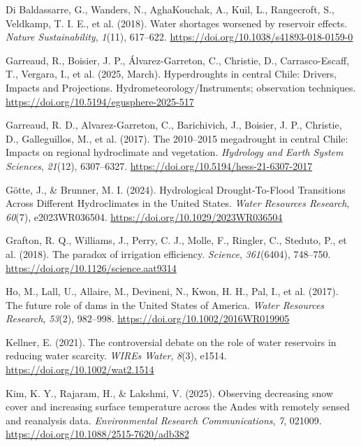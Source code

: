 \documentclass[
]{agujournal2019}
\newlength{\cslhangindent}
\newenvironment{CSLReferences}[2] %
 {\begin{list}{}{%
  \setlength{\itemindent}{0pt}
  \setlength{\leftmargin}{0pt}
  \setlength{\parsep}{0pt}
  \ifodd #1
   \setlength{\leftmargin}{\cslhangindent}
   \setlength{\itemindent}{-1\cslhangindent}
  \fi
  \setlength{\itemsep}{#2\baselineskip}}}
 {\end{list}}
\begin{document}
\begin{CSLReferences}{1}{0}
Di Baldassarre, G., Wanders, N., AghaKouchak, A., Kuil, L., Rangecroft,
S., Veldkamp, T. I. E., et al. (2018). Water shortages worsened by
reservoir effects. \emph{Nature Sustainability}, \emph{1}(11), 617--622.
\url{https://doi.org/10.1038/s41893-018-0159-0}

Garreaud, R., Boisier, J. P., Álvarez-Garreton, C., Christie, D.,
Carrasco-Escaff, T., Vergara, I., et al. (2025, March). Hyperdroughts in
central {Chile}: {Drivers}, {Impacts} and {Projections}.
Hydrometeorology/Instruments; observation techniques.
\url{https://doi.org/10.5194/egusphere-2025-517}

Garreaud, R. D., Alvarez-Garreton, C., Barichivich, J., Boisier, J. P.,
Christie, D., Galleguillos, M., et al. (2017). The 2010--2015
megadrought in central {Chile}: Impacts on regional hydroclimate and
vegetation. \emph{Hydrology and Earth System Sciences}, \emph{21}(12),
6307--6327. \url{https://doi.org/10.5194/hess-21-6307-2017}

Götte, J., \& Brunner, M. I. (2024). Hydrological {Drought}‐{To}‐{Flood}
{Transitions} {Across} {Different} {Hydroclimates} in the {United}
{States}. \emph{Water Resources Research}, \emph{60}(7), e2023WR036504.
\url{https://doi.org/10.1029/2023WR036504}

Grafton, R. Q., Williams, J., Perry, C. J., Molle, F., Ringler, C.,
Steduto, P., et al. (2018). The paradox of irrigation efficiency.
\emph{Science}, \emph{361}(6404), 748--750.
\url{https://doi.org/10.1126/science.aat9314}

Ho, M., Lall, U., Allaire, M., Devineni, N., Kwon, H. H., Pal, I., et
al. (2017). The future role of dams in the {United} {States} of
{America}. \emph{Water Resources Research}, \emph{53}(2), 982--998.
\url{https://doi.org/10.1002/2016WR019905}

Kellner, E. (2021). The controversial debate on the role of water
reservoirs in reducing water scarcity. \emph{WIREs Water}, \emph{8}(3),
e1514. \url{https://doi.org/10.1002/wat2.1514}

Kim, K. Y., Rajaram, H., \& Lakshmi, V. (2025). Observing decreasing
snow cover and increasing surface temperature across the {Andes} with
remotely sensed and reanalysis data. \emph{Environmental Research
Communications}, \emph{7}, 021009.
\url{https://doi.org/10.1088/2515-7620/adb382}


\end{CSLReferences}
\end{document}
